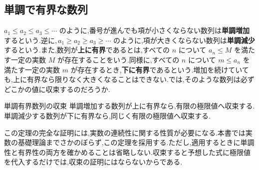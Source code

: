 \subsection{単調で有界な数列}
$a_1\le a_2\le a_3\le\cdots$ のように,番号が進んでも項が小さくならない数列は\textbf{単調増加}するという.逆に,\,$a_1\ge a_2\ge a_3\ge\cdots$ のように,項が大きくならない数列は\textbf{単調減少}するという.また,数列が\textbf{上に有界}であるとは,すべての $n$ について $a_n\le M$ を満たす一定の実数 $M$ が存在することをいう.同様に,すべての $n$ について $m\le a_n$ を満たす一定の実数 $m$ が存在するとき,\textbf{下に有界}であるという.増加を続けていても,上に有界なら限りなく大きくなることはできない.では,そのような数列は必ずどこかの値に収束するのだろうか.

\begin{theorem}{単調有界数列の収束}
単調増加する数列が上に有界なら,有限の極限値へ収束する.単調減少する数列が下に有界なら,同じく有限の極限値へ収束する.
\end{theorem}

この定理の完全な証明には,実数の連続性に関する性質が必要になる.本書では実数の基礎理論までさかのぼらず,この定理を採用する.ただし,適用するときに単調性と有界性の両方を確かめることは省略しない.収束すると予想した式に極限値を代入するだけでは,収束の証明にはならないからである.
